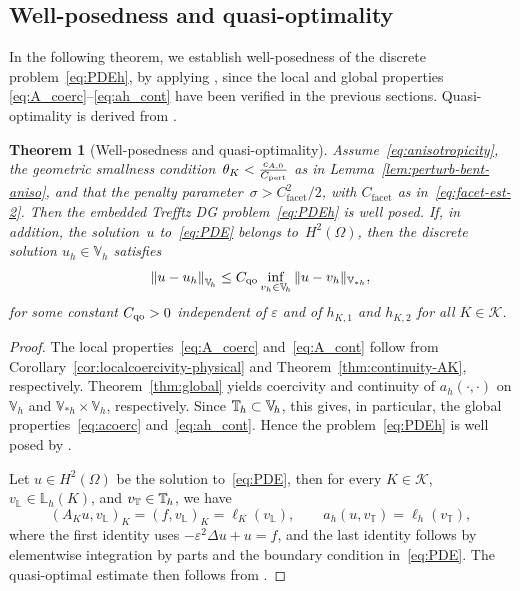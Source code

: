 \documentclass[a4paper,twoside,10pt]{article}
\newtheorem{theorem}{Theorem}[section]
\newcommand{\Vsh}{V_{\!\star \hspace*{-0.2mm}h}}
\newcommand{\LKh}{\mathbb{L}_h(K)}
\newcommand{\eps}{\varepsilon}
\newcommand*{\norm}[1]{\left\|#1\right\|}
\newcommand{\IL}{\mathbb{L}}
\newcommand{\IT}{\mathbb{T}}
\newcommand{\calK}{\mathcal{K}}
\numberwithin{equation}{section}
\newcommand{\Vh}{\mathbb{V}_{\! h}}
\newcommand{\ITh}{\mathbb{T}_{\mspace{-1.5mu} h}}
\renewcommand{\Vsh}{\mathbb{V}_{*h}}
\begin{document}
	\subsection{Well-posedness and quasi-optimality}\label{sec:wp-qo}
	In the following theorem, we establish well-posedness of the discrete problem~\eqref{eq:PDEh}, by applying \cite[Theorem 3.2]{LLSV_ARXIV_2024}, since the local and global properties
    \eqref{eq:A_coerc}--\eqref{eq:ah_cont} have been verified in the previous sections.
	 Quasi-optimality is derived from \cite[Corollary 3.3]{LLSV_ARXIV_2024}.
	\begin{theorem}[Well-posedness and quasi-optimality]
	\label{thm:wp-qo}
	Assume~\eqref{eq:anisotropicity}, the geometric smallness condition~$ \theta_K<\frac{c_{A,0}}{C_{\rm pert}}$ as in Lemma~\ref{lem:perturb-bent-aniso}, 
    and that the penalty parameter~$\sigma 
    > C_{\mathrm{facet}}^2/2$,
	with $C_{\mathrm{facet}}$ as in~\eqref{eq:facet-est-2}.
	Then the embedded Trefftz DG problem~\eqref{eq:PDEh} is well posed.
	If, in addition, the solution~$u$ to~\eqref{eq:PDE} belongs to~$H^2(\Omega)$,
    then the discrete 
	solution $u_h\in\Vh$ satisfies
	\begin{equation*}
	\norm{u-u_h}_{\Vh}
	\le 
	C_{\rm qo}
	\inf_{v_h\in\Vh}\|u-v_h\|_{\Vsh},
	\end{equation*}
	for some constant $C_{\rm qo}>0$ independent of $\eps$ and of 
	  $h_{K,1}$ and $h_{K,2}$ for all $K\in\calK$.
	\end{theorem}
	\begin{proof}
	The local properties~\eqref{eq:A_coerc} and~\eqref{eq:A_cont} follow from
			Corollary~\ref{cor:localcoercivity-physical} and 
			Theorem~\ref{thm:continuity-AK}, respectively.
	Theorem~\ref{thm:global} yields coercivity and continuity of $a_h(\cdot, \cdot)$ 
	on $\Vh$ and $\Vsh\times\Vh$, respectively. Since $\ITh\subset\Vh$, 
	this gives, in particular, the global properties~\eqref{eq:acoerc} and~\eqref{eq:ah_cont}.
	Hence the problem~\eqref{eq:PDEh} is well posed by \cite[Theorem 3.2]{LLSV_ARXIV_2024}.
	
	Let $u\in H^2(\Omega)$ be the solution to~\eqref{eq:PDE}, then for every $K\in\calK$, 
	$v_\IL\in\LKh$, and $v_\IT\in\ITh$, we have
	\begin{equation*}
		(A_Ku,v_\IL)_{K} = (f,v_\IL)_{K} = \ell_K(v_\IL),
		\qquad
		a_h(u,v_\IT) = \ell_h(v_\IT),
	\end{equation*}
	where the first identity uses $-\eps^2\Delta u+u=f$, and the last identity follows by
	elementwise integration by parts and  the boundary condition in~\eqref{eq:PDE}. The quasi-optimal 
	estimate then follows from \cite[Corollary 3.3]{LLSV_ARXIV_2024}.
	\end{proof}
	
\end{document}

